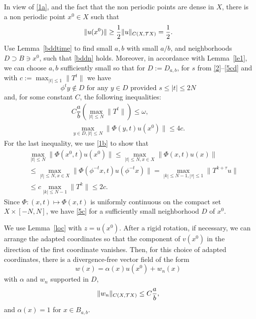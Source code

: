 \begin{pf}
In view of \eqref{1a},
and the fact that the non periodic points are dense in $X$, there is a
non periodic point $x^0\in X$ such that
\begin{equation}\label{4}
\|u(x^0)\|\geq {\displaystyle{1\over2}} \|u\|_{C(X,{{\cal{T}}X})}= {\displaystyle{1\over2}}.
\end{equation}
Use Lemma~\ref{bddtime} to find small $a,b$ with small
$a/b$, and neighborhoods $D\supset B\ni x^0$,
such that \eqref{bddn} holds. Moreover, in accordance with
Lemma~\ref{le1}, we can choose $a,b$ sufficiently small
so that for $D:=D_{a,b}$, for
$s$ from \eqref{2}--\eqref{5cd} and with
$c:=\max_{|t|\le 1}\|T^t\|$
we have
\begin{equation}\label{out}
\phi^ty\not\in D
\text{ for any } y\in D \text{ provided }
s\le |t|\le 2N
\end{equation}
and, for some constant $C$, the following inequalities:
\begin{eqnarray}
C \dfrac{a}{b} \left( \max_{|t|\leq N}\|T^t\|
\right)\leq
\omega,\label{5a}\\
\max_{y\in D,  |t|\leq N} \|\Phi(y,t)u(x^0)\|\leq 4c.
\label{5c}
\end{eqnarray}
For the last inequality, we use \eqref{1b} to show
that
\begin{eqnarray*}
&&\max_{|t|\leq N}\|\Phi(x^0,t)u(x^0)\|\leq
\max_{|t|\leq N, x\in X}\|\Phi(x,t)u(x)\|   \\
&& \leq
\max_{|t|\leq N, x\in X}
\|\Phi(\phi^{-t}x,t)u(\phi^{-t}x)\|
=\max_{|k|\leq N-1, |\tau | \leq 1}\|T^{k+\tau}u\|    \\
&& \leq c \max_{|k|\leq N-1}\|T^k\|\leq 2c.
\end{eqnarray*}
Since $\Phi: (x,t)\mapsto \Phi(x,t)$ is uniformly continuous
on the compact set $X\times [-N,N]$,
we have \eqref{5c} for a sufficiently
small neighborhood $D$ of $x^0$.

We use Lemma~\ref{loc} with $z=u(x^0)$. After a
rigid rotation, if necessary, we can arrange the adapted coordinates
so that the component of $v(x^0)$ in the direction of the first coordinate
vanishes.
Then, for this choice of adapted coordinates,
there is  a divergence-free
vector field of the form
\begin{equation}\label{w}
w(x)=\alpha (x)u(x^0)+w_n(x)
\end{equation}
with $\alpha$ and
$w_n$ supported in $D$,
\begin{equation}\label{w0}
\|w_n\|_{C(X,{{\cal{T}}X})} \leq C{\displaystyle{a\over b}},
\end{equation}
and $\alpha(x)=1$ for $x\in B_{a,b}$.


\end{pf}
